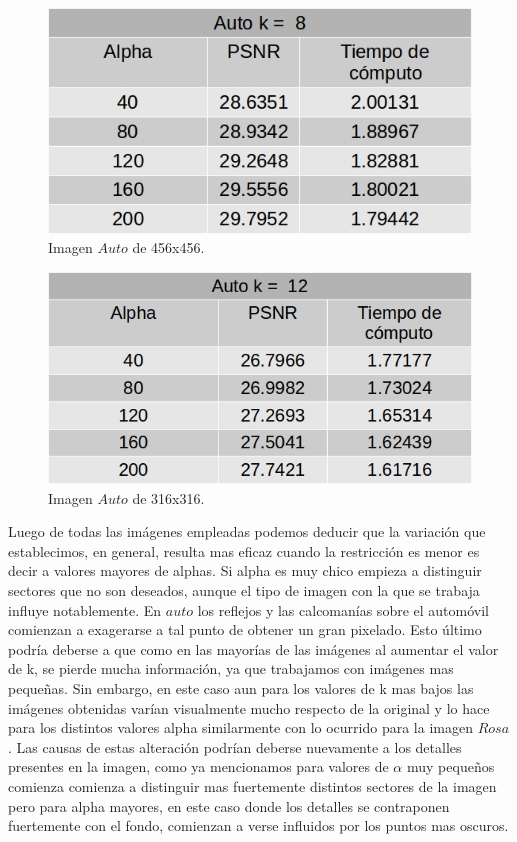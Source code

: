 \documentclass[a4paper]{article}
\begin{document}
    
    \begin{figure}[H]
    \centering
    \includegraphics[scale=0.4]{imagenes/auto8.jpg}
    \caption{Imagen $Auto$ de 456x456.}
	\label{knnTasa2}
    \end{figure}
    
    
    \begin{figure}[H]
    \centering
    \includegraphics[scale=0.4]{imagenes/auto12.jpg}
    \caption{Imagen $Auto$ de 316x316.}
	\label{knnTasa2}
    \end{figure}
    
 
Luego de todas las imágenes empleadas podemos deducir que la variación que establecimos, en general, resulta mas eficaz cuando la restricción es menor es decir a valores mayores de alphas. Si alpha es muy chico empieza a distinguir sectores que no son deseados, aunque el tipo de imagen con la que se trabaja influye notablemente. En $auto$ los reflejos y las calcomanías sobre el automóvil comienzan a exagerarse a tal punto de obtener un gran pixelado. Esto último podría deberse a que como en las mayorías de las imágenes al aumentar el valor de k, se pierde mucha información, ya que trabajamos con imágenes mas pequeñas. Sin embargo, en este caso aun para los valores de k mas bajos las imágenes obtenidas varían visualmente mucho respecto de la original y lo hace para los distintos valores alpha similarmente con lo ocurrido para la imagen $Rosa$. Las causas de estas alteración podrían deberse nuevamente a los detalles presentes en la imagen, como ya mencionamos para valores de $\alpha$ muy pequeños comienza comienza a distinguir mas fuertemente distintos sectores de la imagen pero para alpha mayores, en este caso donde los detalles se contraponen fuertemente con el fondo, comienzan a verse influidos por los puntos mas oscuros. 
\end{document}
